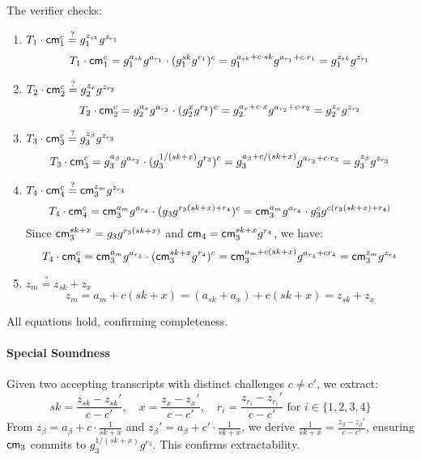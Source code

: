 The verifier checks:
\begin{enumerate}
    \item $T_1 \cdot \mathsf{cm}_1^c \stackrel{?}{=} g_1^{z_{sk}} g^{z_{r_1}}$
    \[
    T_1 \cdot \mathsf{cm}_1^c = g_1^{a_{sk}} g^{a_{r_1}} \cdot (g_1^{sk} g^{r_1})^c = g_1^{a_{sk} + c \cdot sk} g^{a_{r_1} + c \cdot r_1} = g_1^{z_{sk}} g^{z_{r_1}}
    \]
    \item $T_2 \cdot \mathsf{cm}_2^c \stackrel{?}{=} g_2^{z_x} g^{z_{r_2}}$
    \[
    T_2 \cdot \mathsf{cm}_2^c = g_2^{a_x} g^{a_{r_2}} \cdot (g_2^{x} g^{r_2})^c = g_2^{a_x + c \cdot x} g^{a_{r_2} + c \cdot r_2} = g_2^{z_x} g^{z_{r_2}}
    \]
    \item $T_3 \cdot \mathsf{cm}_3^c \stackrel{?}{=} g_3^{z_{\beta}} g^{z_{r_3}}$
    \[
    T_3 \cdot \mathsf{cm}_3^c = g_3^{a_{\beta}} g^{a_{r_3}} \cdot (g_3^{1/(sk + x)} g^{r_3})^c = g_3^{a_{\beta} + c / (sk + x)} g^{a_{r_3} + c \cdot r_3} = g_3^{z_{\beta}} g^{z_{r_3}}
    \]
    \item $T_4 \cdot \mathsf{cm}_4^c \stackrel{?}{=} \mathsf{cm}_3^{z_m} g^{z_{r_4}}$
    \[
    T_4 \cdot \mathsf{cm}_4^c = \mathsf{cm}_3^{a_m} g^{a_{r_4}} \cdot (g_3 g^{r_3 (sk + x) + r_4})^c = \mathsf{cm}_3^{a_m} g^{a_{r_4}} \cdot g_3^c g^{c (r_3 (sk + x) + r_4)}
    \]
    Since $\mathsf{cm}_3^{sk + x} = g_3 g^{r_3 (sk + x)}$ and $\mathsf{cm}_4 = \mathsf{cm}_3^{sk + x} g^{r_4}$, we have:
    \[
    T_4 \cdot \mathsf{cm}_4^c = \mathsf{cm}_3^{a_m} g^{a_{r_4}} \cdot (\mathsf{cm}_3^{sk + x} g^{r_4})^c = \mathsf{cm}_3^{a_m + c (sk + x)} g^{a_{r_4} + c r_4} = \mathsf{cm}_3^{z_m} g^{z_{r_4}}
    \]
    \item $z_m \stackrel{?}{=} z_{sk} + z_x$
    \[
    z_m = a_m + c (sk + x) = (a_{sk} + a_x) + c (sk + x) = z_{sk} + z_x
    \]
\end{enumerate}
All equations hold, confirming completeness.

\paragraph{Special Soundness}
Given two accepting transcripts with distinct challenges $c \neq c'$, we extract:
\[
sk = \frac{z_{sk} - z_{sk}'}{c - c'}, \quad x = \frac{z_x - z_x'}{c - c'}, \quad r_i = \frac{z_{r_i} - z_{r_i}'}{c - c'} \text{ for } i \in \{1,2,3,4\}
\]
From $z_{\beta} = a_{\beta} + c \cdot \frac{1}{sk + x}$ and $z_{\beta}' = a_{\beta} + c' \cdot \frac{1}{sk + x}$, we derive $\frac{1}{sk + x} = \frac{z_{\beta} - z_{\beta}'}{c - c'}$, ensuring $\mathsf{cm}_3$ commits to $g_3^{1/(sk + x)} g^{r_3}$. This confirms extractability.

